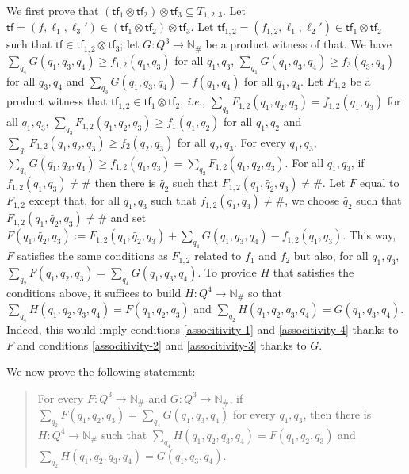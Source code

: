 \documentclass[10pt,a4paper]{article}
\let\mathbb\mathds
\renewcommand{\geq}{\geqslant}
\newcommand{\nats}{\mathbb{N}}
\newcommand{\deff}{:=}
\newcommand*{\states}{Q}
\newcommand*{\abuchistate}{\ell}
\newcommand*{\controlloc}{\abuchistate}
\newcommand*{\dummysymb}{\#}
\newcommand*{\natsanddummy}{\nats_{\dummysymb}}
\newcommand*{\atf}{\mathsf{tf}}
\newcommand*{\tftimes}{\otimes}
\begin{document}
\begin{appendixproof}
	We first prove that \((\atf_1 \tftimes \atf_2) \tftimes \atf_3 \subseteq T_{1,2,3}\).
	Let \(\atf = (f, \controlloc_1, \controlloc_3') \in (\atf_1 \tftimes \atf_2) \tftimes \atf_3\).
	Let \(\atf_{1,2} = (f_{1,2}, \controlloc_1, \controlloc_2')\in \atf_1 \tftimes \atf_2\) such that \(\atf \in \atf_{1,2} \tftimes \atf_3\); let \(G : \states^3 \to \natsanddummy\) be a product witness of that.
	We have \(\sum_{q_4} G(q_1,q_3,q_4) \geq f_{1,2}(q_1,q_3)\) for all \(q_1,q_3\), \(\sum_{q_1} G(q_1,q_3,q_4) \geq f_3(q_3,q_4)\) for all \(q_3,q_4\) and \(\sum_{q_3} G(q_1,q_3,q_4) = f(q_1,q_4)\) for all \(q_1,q_4\).
	Let \(F_{1,2}\) be a product witness that \(\atf_{1,2} \in \atf_1 \tftimes \atf_2\), \emph{i.e.}, \(\sum_{q_2} F_{1,2}(q_1,q_2,q_3) = f_{1,2}(q_1,q_3)\) for all \(q_1,q_3\), \(\sum_{q_3} F_{1,2}(q_1,q_2,q_3) \geq f_1(q_1,q_2)\) for all \(q_1,q_2\) and \(\sum_{q_1} F_{1,2}(q_1,q_2,q_3) \geq f_2(q_2,q_3)\) for all \(q_2,q_3\).
	For every \(q_1,q_3\), \(\sum_{q_4} G(q_1,q_3,q_4) \geq f_{1,2}(q_1,q_3) = \sum_{q_2} F_{1,2}(q_1,q_2,q_3)\).
	For all \(q_1,q_3\), if \(f_{1,2}(q_1,q_3) \ne \dummysymb\) then there is \(\tilde{q_2}\) such that \(F_{1,2}(q_1,\tilde{q_2},q_3) \ne \dummysymb\).
	Let \(F\) equal to \(F_{1,2}\) except that, for all \(q_1,q_3\) such that \(f_{1,2}(q_1,q_3) \ne \dummysymb\), we choose \(\tilde{q_2}\) such that \(F_{1,2}(q_1,\tilde{q_2},q_3) \ne \dummysymb\) and set \(F(q_1,\tilde{q_2}, q_3) \deff F_{1,2}(q_1,\tilde{q_2},q_3)+\sum_{q_4} G(q_1,q_3,q_4) - f_{1,2}(q_1,q_3)\).
	This way, \(F\) satisfies the same conditions as \(F_{1,2}\) related to \(f_1\) and \(f_2\) but also, for all \(q_1,q_3\), \(\sum_{q_2} F(q_1,q_2,q_3) = \sum_{q_4} G(q_1,q_3,q_4)\).
	To provide \(H\) that satisfies the conditions above, it suffices to build \(H: \states^4 \to \natsanddummy\) so that \(\sum_{q_4} H(q_1,q_2,q_3,q_4) = F(q_1,q_2,q_3)\) and \(\sum_{q_2} H(q_1,q_2,q_3,q_4) = G(q_1,q_3,q_4)\).
	Indeed, this would imply conditions \ref{associtivity-1} and \ref{associtivity-4} thanks to \(F\) and conditions \ref{associtivity-2} and \ref{associtivity-3} thanks to \(G\).

	We now prove the following statement:
	\begin{quote}
		For every \(F: \states^3 \to \natsanddummy\) and \(G: \states^3 \to \natsanddummy\), if \(\sum_{q_2} F(q_1,q_2,q_3) = \sum_{q_4} G(q_1,q_3,q_4)\) for every \(q_1,q_3\), then there is \(H: \states^4 \to \natsanddummy\) such that \(\sum_{q_4} H(q_1,q_2,q_3,q_4) = F(q_1,q_2,q_3)\) and \(\sum_{q_2} H(q_1,q_2,q_3,q_4) = G(q_1,q_3,q_4)\).
	\end{quote}


\end{appendixproof}
\end{document}
